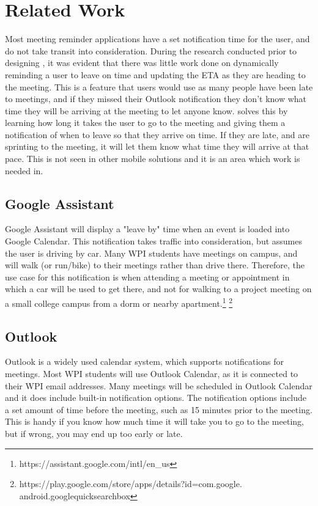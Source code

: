 \section{Related Work}
Most meeting reminder applications have a set notification time for the user, and do not take transit into consideration. During the research conducted prior to designing , it was evident that there was little work done on dynamically reminding a user to leave on time and updating the ETA as they are heading to the meeting. This is a feature that users would use as many people have been late to meetings, and if they missed their Outlook notification they don't know what time they will be arriving at the meeting to let anyone know.  solves this by learning how long it takes the user to go to the meeting and giving them a notification of when to leave so that they arrive on time. If they are late, and are sprinting to the meeting, it will let them know what time they will arrive at that pace. This is not seen in other mobile solutions and it is an area which work is needed in.
\subsection{Google Assistant}
Google Assistant will display a "leave by" time when an event is loaded into Google Calendar. This notification takes traffic into consideration, but assumes the user is driving by car. Many WPI students have meetings on campus, and will walk (or run/bike) to their meetings rather than drive there. Therefore, the use case for this notification is when attending a meeting or appointment in which a car will be used to get there, and not for walking to a project meeting on a small college campus from a dorm or nearby apartment.\footnote{https://assistant.google.com/intl/en\_us} \footnote{https://play.google.com/store/apps/details?id=com.google.\\android.googlequicksearchbox}

\subsection{Outlook} Outlook is a widely used calendar system, which supports notifications for meetings. Most WPI students will use Outlook Calendar, as it is connected to their WPI email addresses. Many meetings will be scheduled in Outlook Calendar and it does include built-in notification options. The notification options include a set amount of time before the meeting, such as 15 minutes prior to the meeting. This is handy if you know how much time it will take you to go to the meeting, but if wrong, you may end up too early or late. 
